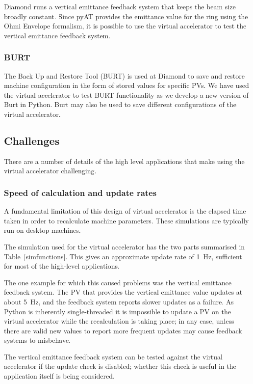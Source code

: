 \documentclass[a4paper,
               keeplastbox,   %
               ]{jacow}
\begin{document}
Diamond runs a vertical emittance feedback system \cite{feedbacks} that keeps the beam 
size broadly constant. Since pyAT provides the emittance value for the ring using the 
Ohmi Envelope formalism, it is possible to use the virtual accelerator to test the 
vertical emittance feedback system.

\subsubsection{BURT}

The Back Up and Restore Tool (BURT) is used at Diamond to save and restore machine
configuration in the form of stored values for specific PVs. We have used the virtual
accelerator to test BURT functionality as we develop a new version of Burt in Python.
Burt may also be used to save different configurations of the virtual accelerator.

\subsection{Challenges}

There are a number of details of the high level applications that make using the
virtual accelerator challenging.

\subsubsection{Speed of calculation and update rates}

A fundamental limitation of this design of virtual accelerator is the elapsed time
taken in order to recalculate machine parameters. These simulations are typically
run on desktop machines.

The simulation used for the virtual accelerator has the two parts summarised in 
Table~\ref{simfunctions}. This gives an approximate update rate of \SI{1}{Hz}, sufficient
for most of the high-level applications.

The one example for which this caused problems was the vertical emittance feedback
system. The PV that provides the vertical emittance value updates at about \SI{5}{Hz},
and the feedback system reports slower updates as a failure. As Python is inherently
single-threaded it is impossible to update a PV on the virtual accelerator while 
the recalculation is taking place; in any case, unless there are valid new values to
report more frequent updates may cause feedback systems to misbehave.

The vertical emittance feedback system can be tested against the virtual accelerator
if the update check is disabled; whether this check is useful in the application itself is
being considered.
\end{document}
